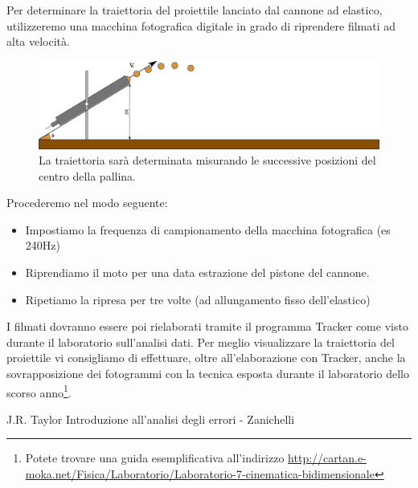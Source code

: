 \documentclass[a4paper,10pt,oneside]{article}
\begin{document}
Per determinare la traiettoria del proiettile lanciato dal cannone ad elastico,  utilizzeremo una macchina fotografica digitale in grado di riprendere filmati ad alta velocità. 
\begin{figure}[H]
 \centering
 \includegraphics[width=\textwidth]{./Immagini/cannone3.png}
 \caption{La traiettoria sarà determinata misurando le successive posizioni del centro della pallina.}
 \label{fig:cannone3}
\end{figure}
Procederemo nel modo seguente:
\begin{itemize}
 \item Impostiamo la frequenza di campionamento della macchina fotografica (es 240Hz)
\item Riprendiamo il moto per una data estrazione del pistone del cannone.
\item Ripetiamo la ripresa per tre volte (ad allungamento fisso dell'elastico)
\end{itemize}
I filmati dovranno essere poi rielaborati tramite il programma Tracker come visto durante il laboratorio sull'analisi dati. Per meglio visualizzare la traiettoria del proiettile vi consigliamo di effettuare, oltre all'elaborazione con Tracker, anche la sovrapposizione dei fotogrammi con la tecnica esposta durante il laboratorio dello scorso anno\footnote{Potete trovare una guida esemplificativa all'indirizzo \url{http://cartan.e-moka.net/Fisica/Laboratorio/Laboratorio-7-cinematica-bidimensionale}}.





\begin{thebibliography}{}
  J.R. Taylor Introduzione all'analisi degli errori - Zanichelli
\end{thebibliography}
\end{document}
